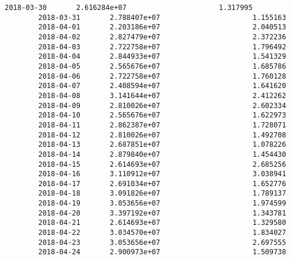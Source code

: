 \documentclass[11pt]{article}
\begin{document}
\begin{Verbatim}[commandchars=\\\{\}]
        2018-03-30       2.616284e+07                      1.317995   
        2018-03-31       2.788407e+07                      1.155163   
        2018-04-01       2.203186e+07                      2.040513   
        2018-04-02       2.827479e+07                      2.372236   
        2018-04-03       2.722758e+07                      1.796492   
        2018-04-04       2.844933e+07                      1.541329   
        2018-04-05       2.565676e+07                      1.685786   
        2018-04-06       2.722758e+07                      1.760128   
        2018-04-07       2.408594e+07                      1.641620   
        2018-04-08       3.141644e+07                      2.412262   
        2018-04-09       2.810026e+07                      2.602334   
        2018-04-10       2.565676e+07                      1.622973   
        2018-04-11       2.862387e+07                      1.728071   
        2018-04-12       2.810026e+07                      1.492708   
        2018-04-13       2.687851e+07                      1.078226   
        2018-04-14       2.879840e+07                      1.454430   
        2018-04-15       2.614693e+07                      2.685256   
        2018-04-16       3.110912e+07                      3.038941   
        2018-04-17       2.691034e+07                      1.652776   
        2018-04-18       3.091826e+07                      1.789137   
        2018-04-19       3.053656e+07                      1.974599   
        2018-04-20       3.397192e+07                      1.343781   
        2018-04-21       2.614693e+07                      1.329580   
        2018-04-22       3.034570e+07                      1.834027   
        2018-04-23       3.053656e+07                      2.697555   
        2018-04-24       2.900973e+07                      1.509738   
        

\end{Verbatim}
\end{document}
